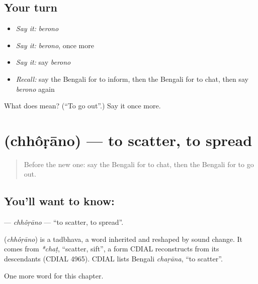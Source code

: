 \subsection*{Your turn}
\begin{itemize}
\raggedright
  \item \emph{Say it:} \emph{berono}
  \item \emph{Say it:} \emph{berono}, once more
  \item \emph{Say it:} say \emph{berono}
  \item \emph{Recall:} say the Bengali for to inform, then the Bengali for to chat, then say \emph{berono} again
\end{itemize}

\begin{tcolorbox}[breakable,colback=teal!4,colframe=teal!35!black,title={Before you move on}]
What does  mean? (\textquotedblleft{}To go out\textquotedblright{}.) Say it once more.
\end{tcolorbox}
\section[\texorpdfstring{\bn{ছড়ানো} (chhôṛāno)}{ছড়ানো (chhôṛāno)}]{ (chhôṛāno) — to scatter, to spread}

\label{lesson:BN-C242-chhorano}



\begin{quote}
Before the new one: say the Bengali for to chat, then the Bengali for to go out.
\end{quote}

\subsection*{You'll want to know: }
\textbf{} — \emph{chhôṛāno} — \textquotedblleft{}to scatter, to spread\textquotedblright{}.

\begin{cousinweb}
\textbf{} (\emph{chhôṛāno}) is a tadbhava, a word inherited and reshaped by sound change. It comes from \emph{*chaṭ}, \textquotedblleft{}scatter, sift\textquotedblright{}, a form CDIAL reconstructs from its descendants (CDIAL 4965). CDIAL lists Bengali \emph{chaṛāna}, \textquotedblleft{}to scatter\textquotedblright{}.
\end{cousinweb}

\begin{grammarlens}[title={What you've built}]
One more word for this chapter.
\end{grammarlens}

